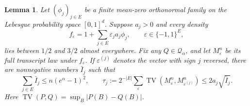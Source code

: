 \documentclass[11pt]{article}
\newtheorem{lemma}[theorem]{Lemma}
\newcommand{\TV}{\operatorname{TV}}
\begin{document}
\begin{lemma}\label{lem:trace}
Let $(\phi_j)_{j\in E}$ be a finite mean-zero orthonormal family on the
Lebesgue probability space $[0,1]^d$. Suppose $a_j>0$ and every density
\[
 f_\varepsilon=1+\sum_{j\in E}\varepsilon_j a_j\phi_j,
 \qquad \varepsilon\in\{-1,1\}^{E},
\]
lies between $1/2$ and $3/2$ almost everywhere. Fix any
$Q\in\mathcal Q_\alpha$, and let $M_\varepsilon^n$ be its full transcript
law under $f_\varepsilon$. If $\varepsilon^{(j)}$ denotes the vector with
sign $j$ reversed, there are nonnegative numbers $\bar I_j$ such that
\begin{equation}\label{eq:trace-test}
 \sum_{j\in E}\bar I_j\le n(e^\alpha-1)^2,\qquad
 \tau_j:=2^{-|E|}\sum_\varepsilon
 \TV(M_\varepsilon^n,M_{\varepsilon^{(j)}}^n)
 \le2a_j\sqrt{\bar I_j}.
\end{equation}
Here $\TV(P,Q)=\sup_B|P(B)-Q(B)|$.
\end{lemma}
\end{document}
